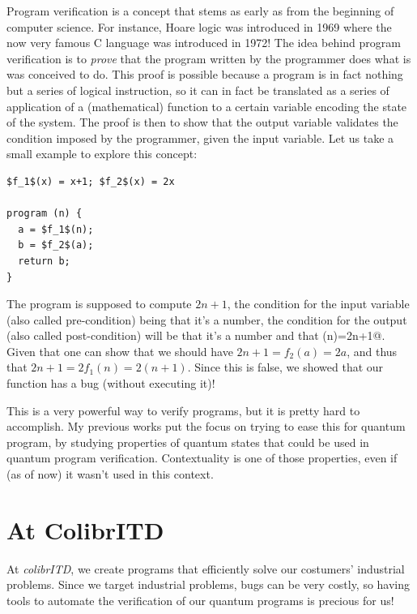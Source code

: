 \documentclass{article}
\begin{document}
Program verification is a concept that stems as early as from the beginning of
computer science. For instance, Hoare logic \cite{Hoa69} was introduced in 1969
where the now very famous C language was introduced in 1972! The idea behind
program verification is to \emph{prove} that the program written by the
programmer does what is was conceived to do. This proof is possible because a
program is in fact nothing but a series of logical instruction, so it can in fact
be translated as a series of application of a (mathematical) function to a
certain variable encoding the state of the system. The proof is then to show that
the output variable validates the condition imposed by the programmer, given the
input variable. Let us take a small example to explore this concept:
\begin{lstlisting}
$f_1$(x) = x+1; $f_2$(x) = 2x

program (n) {
  a = $f_1$(n);
  b = $f_2$(a);
  return b;
}
\end{lstlisting}
The program is supposed to compute $2n+1$, the condition for the input variable
(also called pre-condition) being that it's a number, the condition for the
output (also called post-condition) will be that it's a number and that 
\verb@program(n)=2n+1@. Given that one can show that we should have 
$2n+1=f_2(a)=2a$, and thus that $2n+1=2f_1(n)=2(n+1)$. Since this is false, we
showed that our function has a bug (without executing it)!

This is a very powerful way to verify programs, but it is pretty hard to
accomplish. My previous works put the focus on trying to ease this for quantum
program, by studying properties of quantum states that could be used in quantum
program verification. Contextuality is one of those properties, even if (as of
now) it wasn't used in this context.

\section*{At ColibrITD}

At \emph{colibrITD}, we create programs that efficiently solve our costumers'
industrial problems. Since we target industrial problems, bugs can be very
costly, so having tools to automate the verification of our quantum programs is
precious for us!



\end{document}
